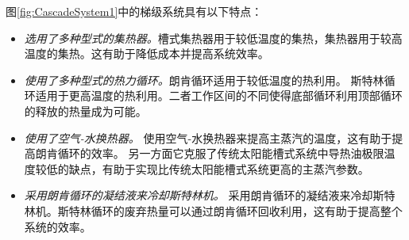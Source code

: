 图\ref{fig:CascadeSystem1}中的梯级系统具有以下特点：
\begin{itemize}
  \item \emph{选用了多种型式的集热器。}槽式集热器用于较低温度的集热，集热器用于较高温度的集热。这有助于降低成本并提高系统效率。
  \item \emph{使用了多种型式的热力循环。}朗肯循环适用于较低温度的热利用。 斯特林循环适用于更高温度的热利用。二者工作区间的不同使得底部循环利用顶部循环的释放的热量成为可能。
  \item \emph{使用了空气-水换热器。} 使用空气-水换热器来提高主蒸汽的温度，这有助于提高朗肯循环的效率。 另一方面它克服了传统太阳能槽式系统中导热油极限温度较低的缺点，有助于实现比传统太阳能槽式系统更高的主蒸汽参数。 
  \item \emph{采用朗肯循环的凝结液来冷却斯特林机。} 采用朗肯循环的凝结液来冷却斯特林机。斯特林循环的废弃热量可以通过朗肯循环回收利用，这有助于提高整个系统的效率。
\end{itemize}


